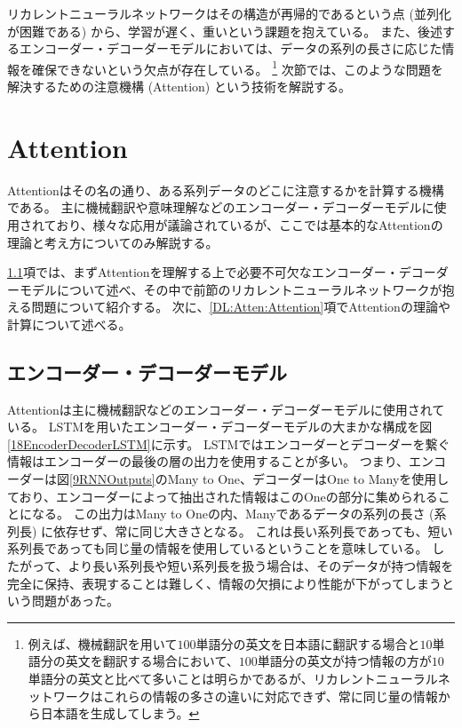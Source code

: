 リカレントニューラルネットワークはその構造が再帰的であるという点 (並列化が困難である) から、学習が遅く、重いという課題を抱えている。
また、後述するエンコーダー・デコーダーモデルにおいては、データの系列の長さに応じた情報を確保できないという欠点が存在している。
\footnote{例えば、機械翻訳を用いて$100$単語分の英文を日本語に翻訳する場合と$10$単語分の英文を翻訳する場合において、$100$単語分の英文が持つ情報の方が$10$単語分の英文と比べて多いことは明らかであるが、リカレントニューラルネットワークはこれらの情報の多さの違いに対応できず、常に同じ量の情報から日本語を生成してしまう。}
次節では、このような問題を解決するための注意機構 (Attention) という技術を解説する。


\section{Attention} \label{DL:Attention}

Attention\cite{BahdanauAttention, LuongAttention}はその名の通り、ある系列データのどこに注意するかを計算する機構である。
主に機械翻訳や意味理解などのエンコーダー・デコーダーモデルに使用されており、様々な応用が議論されているが、ここでは基本的なAttentionの理論と考え方についてのみ解説する。

\ref{DL:Atten:EncoderDecoderModel}項では、まずAttentionを理解する上で必要不可欠なエンコーダー・デコーダーモデルについて述べ、その中で前節のリカレントニューラルネットワークが抱える問題について紹介する。
次に、\ref{DL:Atten:Attention}項でAttentionの理論や計算について述べる。


\subsection{エンコーダー・デコーダーモデル} \label{DL:Atten:EncoderDecoderModel}

Attentionは主に機械翻訳などのエンコーダー・デコーダーモデルに使用されている。
LSTMを用いたエンコーダー・デコーダーモデルの大まかな構成を図\ref{18EncoderDecoderLSTM}に示す。
LSTMではエンコーダーとデコーダーを繋ぐ情報はエンコーダーの最後の層の出力を使用することが多い。
つまり、エンコーダーは図\ref{9RNNOutputs}のMany to One、デコーダーはOne to Manyを使用しており、エンコーダーによって抽出された情報はこのOneの部分に集められることになる。
この出力はMany to Oneの内、Manyであるデータの系列の長さ (系列長) に依存せず、常に同じ大きさとなる。
これは長い系列長であっても、短い系列長であっても同じ量の情報を使用しているということを意味している。
したがって、より長い系列長や短い系列長を扱う場合は、そのデータが持つ情報を完全に保持、表現することは難しく、情報の欠損により性能が下がってしまうという問題があった。

